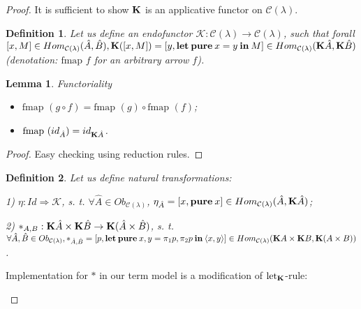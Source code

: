 \documentclass[a4paper]{article}
\newtheorem{lemma}{Lemma}
\newtheorem{defin}{Definition}
\begin{document}
\begin{proof}
It is sufficient to show ${\bf K}$ is an applicative functor on $\mathcal{C}(\lambda)$.

\begin{defin}
  Let us define an endofunctor $\mathcal{K} : \mathcal{C}(\lambda) \to \mathcal{C}(\lambda)$, such that
forall $[x,M] \in Hom_{\mathcal{C}(\lambda)}(\hat{A},\hat{B}), {\bf K}([x,M]) = [y, {\bf let \: pure \:} x = y {\: \bf in \:} M] \in Hom_{\mathcal{C}(\lambda)}({\bf K} \hat{A}, {\bf K} \hat{B})$ (denotation: $\text{fmap } f$ for an arbitrary arrow $f$).

\end{defin}

\begin{lemma} Functoriality

\begin{itemize}
  \item $\text{fmap }(g \circ f) = \text{fmap }(g) \circ \text{fmap }(f)$;
  \item $\text{fmap }(id_{\hat{A}}) = id_{{\bf K}\hat{A}}$.
\end{itemize}
\end{lemma}

\begin{proof}

Easy checking using reduction rules.

\end{proof}

\begin{defin}

  Let us define natural transformations:

  1) $\eta:Id \Rightarrow \mathcal{K}$, s. t. $\forall \hat{A} \in Ob_{\mathcal{C}(\lambda)}$, $\eta_{\hat{A}} = [x, {\bf pure \:} x] \in Hom_{\mathcal{C}(\lambda)}(\hat{A}, {\bf K}\hat{A})$;

  2) $\ast_{A,B}:{\bf K}\hat{A} \times {\bf K}\hat{B} \to {\bf K}(\hat{A} \times \hat{B})$, s. t. $\forall \hat{A}, \hat{B} \in Ob_{\mathcal{C}(\lambda)}, \ast_{\hat{A},\hat{B}} = [p, {\bf let \: pure \:} x,y = \pi_1 p, \pi_2 p {\: \bf in \:} \langle x, y \rangle] \in Hom_{\mathcal{C}(\lambda)}({\bf K}A \times {\bf K}B, {\bf K}(A \times B))$.
\end{defin}

Implementation for $\ast$ in our term model is a modification of ${\text{let}_{\bf K}}$-rule:

\begin{prooftree}
\end{prooftree}


\end{proof}
\end{document}
